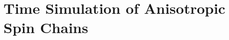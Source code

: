 \documentclass[twoside]{report}
\begin{document}
 \chapter{Time Simulation of Anisotropic Spin Chains}
 \label{chap:main}
 
%  
  \printbibliography
\end{document}
